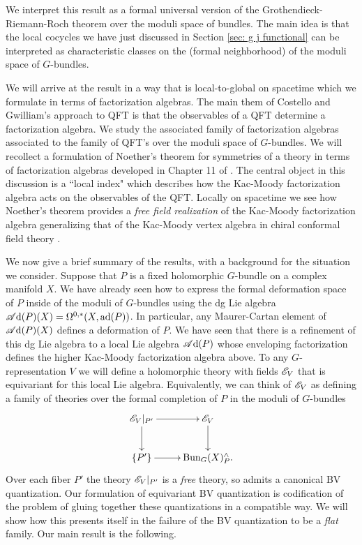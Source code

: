 \documentclass[10pt]{amsart}
\def\sAd{\sA{\rm d}}
\begin{document}
We interpret this result as a formal universal version of the Grothendieck-Riemann-Roch theorem over the moduli space of bundles. 
The main idea is that the local cocycles we have just discussed in Section \ref{sec: g j functional} can be interpreted as characteristic classes on the (formal neighborhood) of the moduli space of $G$-bundles.

We will arrive at the result in a way that is local-to-global on spacetime which we formulate in terms of factorization algebras.
The main them of Costello and Gwilliam's approach to QFT is that the observables of a QFT determine a factorization algebra. 
We study the associated family of factorization algebras associated to the family of QFT's over the moduli space of $G$-bundles.
We will recollect a formulation of Noether's theorem for symmetries of a theory in terms of factorization algebras developed in Chapter 11 of \cite{CG2}. 
The central object in this discussion is a ``local index" which describes how the Kac-Moody factorization algebra acts on the observables of the QFT. 
Locally on spacetime we see how Noether's theorem provides a {\em free field realization} of the Kac-Moody factorization algebra generalizing that of the Kac-Moody vertex algebra in chiral conformal field theory \cite{FrenkelFree}. 

We now give a brief summary of the results, with a background for the situation we consider.
Suppose that $P$ is a fixed holomorphic $G$-bundle on a complex manifold $X$.
We have already seen how to express the formal deformation space of $P$ inside of the moduli of $G$-bundles using the dg Lie algebra $\sAd(P)(X) = \Omega^{0,*}(X , \ad (P))$.
In particular, any Maurer-Cartan element of $\sAd(P)(X)$ defines a deformation of $P$. 
We have seen that there is a refinement of this dg Lie algebra to a local Lie algebra $\sAd(P)$ whose enveloping factorization defines the higher Kac-Moody factorization algebra above.
To any $G$-representation $V$ we will define a holomorphic theory with fields $\mathscr E_V$ that is equivariant for this local Lie algebra. 
Equivalently, we can think of $\mathscr E_V$ as defining a family of theories over the formal completion of $P$ in the moduli of $G$-bundles
\[
\xymatrix{
\sE_V|_{P'} \ar[d] \ar[r] & \sE_V \ar[d] \\
\{P'\} \ar[r] & {\rm Bun}_G(X)^{\wedge}_P .
}
\]
Over each fiber $P'$ the theory $\mathscr E_V|_{P'}$ is a {\em free} theory, so admits a canonical BV quantization. 
Our formulation of equivariant BV quantization is codification of the problem of gluing together these quantizations in a compatible way.
We will show how this presents itself in the failure of the BV quantization to be a {\em flat} family. 
Our main result is the following. 
\end{document}
